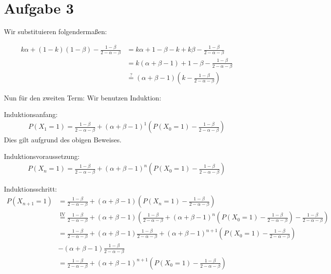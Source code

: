 \documentclass[10pt,a4paper,parskip=half]{scrartcl}
\begin{document}
\section*{Aufgabe 3}
Wir substituieren folgendermaßen:

\begin{align*}
k\alpha + (1-k)(1-\beta) - \frac{1 -\beta}{2 -\alpha-\beta} &= k\alpha + 1 -\beta -k +k\beta - \frac{1 -\beta}{2 -\alpha-\beta} \\
&= k(\alpha + \beta - 1) + 1 - \beta - \frac{1 -\beta}{2 -\alpha-\beta} \\
&\overset{?}{=} (\alpha + \beta -1)\left(k - \frac{1 -\beta}{2 -\alpha -\beta}\right)
\end{align*}

Nun für den zweiten Term:
Wir benutzen Induktion:

Induktionsanfang: 
\begin{align*}
P(X_1 = 1) = \frac{1-\beta}{2-\alpha-\beta} + (\alpha +\beta -1)^1\left(P(X_0 = 1) - \frac {1-\beta}{2-\alpha-\beta}\right)
\end{align*}
Dies gilt aufgrund des obigen Beweises.

Induktionsvoraussetzung:
\begin{align*}
P(X_{n} = 1) = \frac{1-\beta}{2-\alpha-\beta} + (\alpha +\beta -1)^n\left(P(X_0 = 1) - \frac {1-\beta}{2-\alpha-\beta}\right)
\end{align*}

Induktionsschritt:
\begin{align*}
P(X_{n+1} = 1) &= \frac{1-\beta}{2-\alpha-\beta} + (\alpha +\beta -1)\left(P(X_n = 1) - \frac {1-\beta}{2-\alpha-\beta}\right)\\
&\overset{\text{IV}}{=} \frac{1-\beta}{2-\alpha-\beta} + (\alpha +\beta -1)\left(\frac{1-\beta}{2-\alpha-\beta} + (\alpha +\beta -1)^n\left(P(X_0 = 1) - \frac {1-\beta}{2-\alpha-\beta}\right) - \frac {1-\beta}{2-\alpha-\beta}\right)\\
&= \frac{1-\beta}{2-\alpha-\beta} + (\alpha +\beta -1)\frac{1-\beta}{2-\alpha-\beta} + (\alpha +\beta -1)^{n+1}\left(P(X_0 = 1) - \frac {1-\beta}{2-\alpha-\beta}\right)\\
&-(\alpha +\beta -1)\frac{1-\beta}{2-\alpha-\beta}\\
&= \frac{1-\beta}{2-\alpha-\beta} + (\alpha +\beta -1)^{n+1}\left(P(X_0 = 1) - \frac {1-\beta}{2-\alpha-\beta}\right)
\end{align*}
\end{document}
